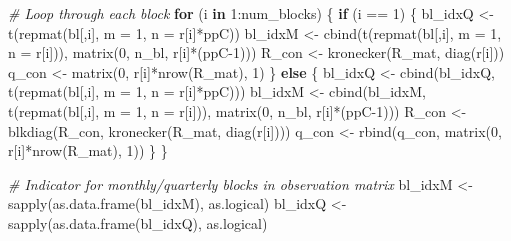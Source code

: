 \documentclass[
]{article}
\newenvironment{Shaded}{\begin{snugshade}}{\end{snugshade}}
\newcommand{\AttributeTok}[1]{\textcolor[rgb]{0.77,0.63,0.00}{#1}}
\newcommand{\CommentTok}[1]{\textcolor[rgb]{0.56,0.35,0.01}{\textit{#1}}}
\newcommand{\ControlFlowTok}[1]{\textcolor[rgb]{0.13,0.29,0.53}{\textbf{#1}}}
\newcommand{\DecValTok}[1]{\textcolor[rgb]{0.00,0.00,0.81}{#1}}
\newcommand{\FunctionTok}[1]{\textcolor[rgb]{0.00,0.00,0.00}{#1}}
\newcommand{\NormalTok}[1]{#1}
\newcommand{\OtherTok}[1]{\textcolor[rgb]{0.56,0.35,0.01}{#1}}
\newcommand{\SpecialCharTok}[1]{\textcolor[rgb]{0.00,0.00,0.00}{#1}}
\begin{document}
\begin{Shaded}
\begin{Highlighting}[]
  \CommentTok{\# Loop through each block}
  \ControlFlowTok{for}\NormalTok{ (i }\ControlFlowTok{in} \DecValTok{1}\SpecialCharTok{:}\NormalTok{num\_blocks) \{}
    \ControlFlowTok{if}\NormalTok{ (i }\SpecialCharTok{==} \DecValTok{1}\NormalTok{) \{}
\NormalTok{      bl\_idxQ }\OtherTok{\textless{}{-}} \FunctionTok{t}\NormalTok{(}\FunctionTok{repmat}\NormalTok{(bl[,i], }\AttributeTok{m =} \DecValTok{1}\NormalTok{, }\AttributeTok{n =}\NormalTok{ r[i]}\SpecialCharTok{*}\NormalTok{ppC))}
\NormalTok{      bl\_idxM }\OtherTok{\textless{}{-}} \FunctionTok{cbind}\NormalTok{(}\FunctionTok{t}\NormalTok{(}\FunctionTok{repmat}\NormalTok{(bl[,i], }\AttributeTok{m =} \DecValTok{1}\NormalTok{, }\AttributeTok{n =}\NormalTok{ r[i])), }\FunctionTok{matrix}\NormalTok{(}\DecValTok{0}\NormalTok{, n\_bl, r[i]}\SpecialCharTok{*}\NormalTok{(ppC}\DecValTok{{-}1}\NormalTok{)))}
\NormalTok{      R\_con }\OtherTok{\textless{}{-}} \FunctionTok{kronecker}\NormalTok{(R\_mat, }\FunctionTok{diag}\NormalTok{(r[i]))}
\NormalTok{      q\_con }\OtherTok{\textless{}{-}} \FunctionTok{matrix}\NormalTok{(}\DecValTok{0}\NormalTok{, r[i]}\SpecialCharTok{*}\FunctionTok{nrow}\NormalTok{(R\_mat), }\DecValTok{1}\NormalTok{)}
\NormalTok{    \}}
    \ControlFlowTok{else}\NormalTok{ \{}
\NormalTok{      bl\_idxQ }\OtherTok{\textless{}{-}} \FunctionTok{cbind}\NormalTok{(bl\_idxQ, }\FunctionTok{t}\NormalTok{(}\FunctionTok{repmat}\NormalTok{(bl[,i], }\AttributeTok{m =} \DecValTok{1}\NormalTok{, }\AttributeTok{n =}\NormalTok{ r[i]}\SpecialCharTok{*}\NormalTok{ppC)))}
\NormalTok{      bl\_idxM }\OtherTok{\textless{}{-}} \FunctionTok{cbind}\NormalTok{(bl\_idxM, }\FunctionTok{t}\NormalTok{(}\FunctionTok{repmat}\NormalTok{(bl[,i], }\AttributeTok{m =} \DecValTok{1}\NormalTok{, }\AttributeTok{n =}\NormalTok{ r[i])), }\FunctionTok{matrix}\NormalTok{(}\DecValTok{0}\NormalTok{, n\_bl, r[i]}\SpecialCharTok{*}\NormalTok{(ppC}\DecValTok{{-}1}\NormalTok{)))}
\NormalTok{      R\_con }\OtherTok{\textless{}{-}} \FunctionTok{blkdiag}\NormalTok{(R\_con, }\FunctionTok{kronecker}\NormalTok{(R\_mat, }\FunctionTok{diag}\NormalTok{(r[i])))}
\NormalTok{      q\_con }\OtherTok{\textless{}{-}} \FunctionTok{rbind}\NormalTok{(q\_con, }\FunctionTok{matrix}\NormalTok{(}\DecValTok{0}\NormalTok{, r[i]}\SpecialCharTok{*}\FunctionTok{nrow}\NormalTok{(R\_mat), }\DecValTok{1}\NormalTok{))}
\NormalTok{    \}}
\NormalTok{  \}}
  
  \CommentTok{\# Indicator for monthly/quarterly blocks in observation matrix}
\NormalTok{  bl\_idxM }\OtherTok{\textless{}{-}} \FunctionTok{sapply}\NormalTok{(}\FunctionTok{as.data.frame}\NormalTok{(bl\_idxM), as.logical)}
\NormalTok{  bl\_idxQ }\OtherTok{\textless{}{-}} \FunctionTok{sapply}\NormalTok{(}\FunctionTok{as.data.frame}\NormalTok{(bl\_idxQ), as.logical)}
  

\end{Highlighting}
\end{Shaded}
\end{document}
